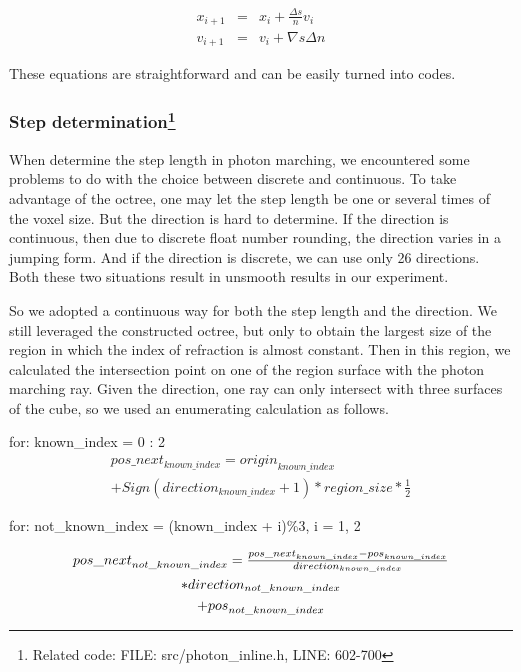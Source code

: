 \documentclass[a4paper]{article}
\begin{document}
\begin{CJK*}{UTF8}{gkai}
\begin{eqnarray*}
x_{i+1} & = & x_i + \frac{\Delta s}{n} v_i \\
v_{i+1} & = & v_i + \nabla s \Delta n
\end{eqnarray*}

These equations are straightforward and can be easily turned into codes.

\subsubsection[Step determination]{Step determination\footnote{Related code: FILE: src/photon\_inline.h, LINE: 602-700}}
When determine the step length in photon marching, we encountered some problems to do with the choice between discrete and continuous. To take advantage of the octree, one may let the step length be one or several times of the voxel size. But the direction is hard to determine. If the direction is continuous, then due to discrete float number rounding, the direction varies in a jumping form. And if the direction is discrete, we can use only 26 directions. Both these two situations result in unsmooth results in our experiment.

So we adopted a continuous way for both the step length and the direction. We still leveraged the constructed octree, but only to obtain the largest size of the region in which the index of refraction is almost constant. Then in this region, we calculated the intersection point on one of the region surface with the photon marching ray. Given the direction, one ray can only intersect with three surfaces of the cube, so we used an enumerating calculation as follows.

for: known\_index = 0 : 2
\begin{multline*}
{pos\_next_{known\_index}} = {origin}_{known\_index} \\
+ Sign({direction}_{known\_index} +1)*{region\_size}*\frac{1}{2} 
\end{multline*}

for: not\_known\_index = (known\_index + i)\%3, i = 1, 2

\begin{multline*}
$${pos\_next}_{not\_known\_index} = \frac{{pos\_next}_{known\_index} - {pos}_{known\_index}}{{direction}_{known\_index}} \\
* {direction}_{not\_known\_index}  \\
+ {pos}_{not\_known\_index}$$
\end{multline*}


\end{CJK*}
\end{document}
